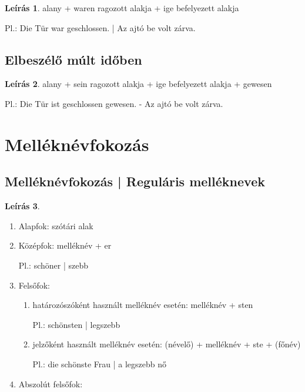 \documentclass{article}
\theoremstyle{definition}
\newtheorem*{desc}{Leírás}
\begin{document}
\begin{desc}
alany + waren ragozott alakja + ige befelyezett alakja

Pl.: Die Tür war geschlossen. | Az ajtó be volt zárva.
\end{desc}

\subsection{Elbeszélő múlt időben}

\begin{desc}
alany + sein ragozott alakja + ige befelyezett alakja + gewesen

Pl.: Die Tür ist geschlossen gewesen. - Az ajtó be volt zárva.
\end{desc}

\section{Melléknévfokozás}

\subsection{Melléknévfokozás | Reguláris melléknevek}

\begin{desc}

\begin{enumerate}
\item Alapfok: szótári alak
\item Középfok: melléknév + er

Pl.: schöner | szebb

\item Felsőfok:
\begin{enumerate}
\item határozószóként használt melléknév esetén: melléknév + sten

Pl.: schönsten | legszebb

\item jelzőként használt melléknév esetén: (névelő) + melléknév + ste + (főnév)

Pl.: die schönste Frau | a legszebb nő
\end{enumerate}

\item Abszolút felsőfok:
\end{enumerate}
\end{desc}
\end{document}
